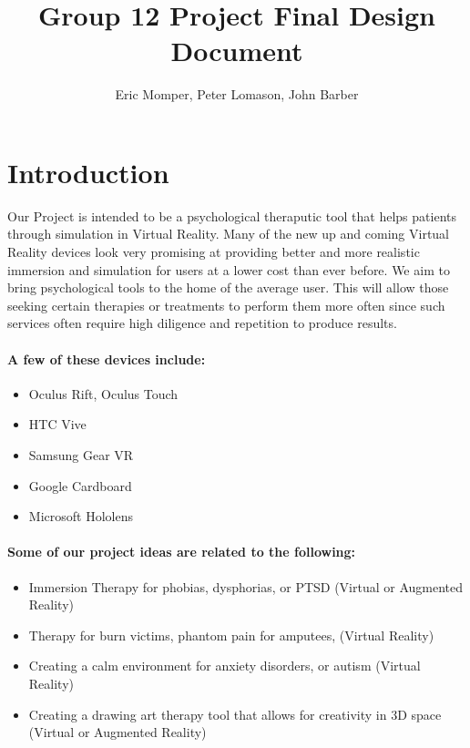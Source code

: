 \documentclass[a4paper,10pt]{article}
\title{Group 12 Project Final Design Document}
\author{Eric Momper, Peter Lomason, John Barber}
\begin{document}
	
	\maketitle
	
	\pagebreak
	\tableofcontents
	\pagebreak
	
	\section{Introduction}
		Our Project is intended to be a psychological theraputic tool that helps patients through simulation in Virtual Reality.
	Many of the new up and coming Virtual Reality devices look very promising at providing better and more realistic immersion and simulation for users at a lower cost than ever before. We aim to bring psychological tools to the home of the average user. This will allow those seeking certain therapies or treatments to perform them more often since such services often require high diligence and repetition to produce results.
	
	\paragraph{A few of these devices include:}
	\begin{itemize}
		\item Oculus Rift, Oculus Touch
		\item HTC Vive
		\item Samsung Gear VR
		\item Google Cardboard
		\item Microsoft Hololens
	\end{itemize}
	
	\paragraph{ Some of our project ideas are related to the following:}
	\begin{itemize}
		\item ​Immersion Therapy for phobias, dysphorias, or PTSD (Virtual or Augmented Reality)
		\item Therapy for burn victims, phantom pain for amputees,  (Virtual Reality)
		\item Creating a calm environment for  anxiety disorders, or autism (Virtual Reality)
		\item Creating a drawing art therapy tool that allows for creativity in 3D space (Virtual or Augmented Reality)
	\end{itemize}
	
\end{document}
